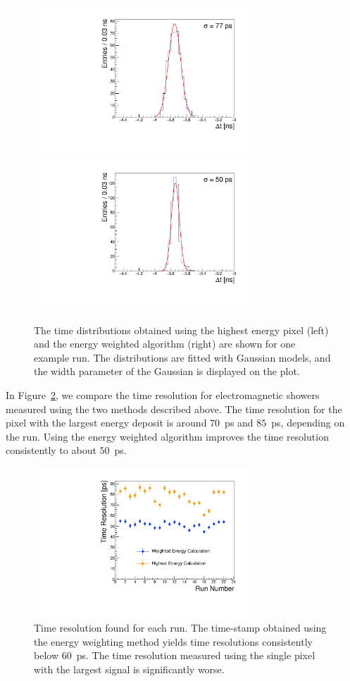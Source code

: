 \documentclass[12pt]{article}
\begin{document}
\begin{figure}[htbp] 
\centering
\includegraphics[width=8cm]{Images/exdt/exdtHI.pdf}
\includegraphics[width=8cm]{Images/exdt/exdtWI.pdf} 
\caption{\small The time distributions obtained using the highest energy pixel (left) and the energy weighted algorithm (right) are shown for one example run. The distributions are
fitted with Gaussian models, and the width parameter of the Gaussian is
displayed on the plot.} 
\label{fig:exdt} 
\end{figure} 

In Figure~\ref{fig:wtres}, we compare the time resolution for electromagnetic
showers measured using the two methods described above. The time resolution for
the pixel with the largest energy deposit is around $70$~ps and $85$~ps,
depending on the run. Using the energy weighted algorithm improves the time
resolution consistently to about $50$~ps. 

\begin{figure}[htbp] 
\centering
\includegraphics[width=8cm]{Images/wtres/tresperrun.pdf} 
\caption{\small Time resolution found for each run. The time-stamp obtained using the energy weighting method yields time resolutions consistently below $60$~ps. The time resolution measured using the single pixel with the largest signal is significantly worse.} 
\label{fig:wtres} 
\end{figure} 
\end{document}
